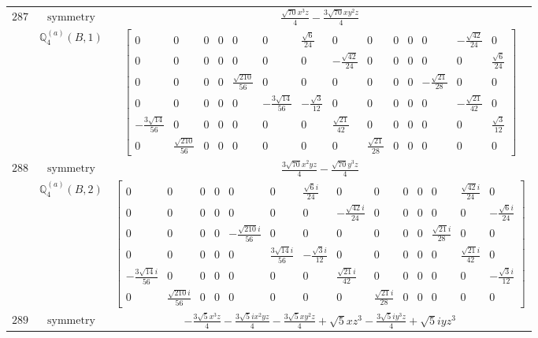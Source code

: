 \documentclass[fleqn,8pt,landscape]{jsarticle}
\begin{document}
\begin{longtable}{ccc}
$ 287 $ & $ \text{symmetry} $ & $ \frac{\sqrt{70} x^{3} z}{4} - \frac{3 \sqrt{70} x y^{2} z}{4} $ \\
$  $ & $ \mathbb{Q}_{4}^{(a)}(B,1) $ & $ \begin{bmatrix} 0 & 0 & 0 & 0 & 0 & 0 & \frac{\sqrt{6}}{24} & 0 & 0 & 0 & 0 & 0 & - \frac{\sqrt{42}}{24} & 0 \\ 0 & 0 & 0 & 0 & 0 & 0 & 0 & - \frac{\sqrt{42}}{24} & 0 & 0 & 0 & 0 & 0 & \frac{\sqrt{6}}{24} \\ 0 & 0 & 0 & 0 & \frac{\sqrt{210}}{56} & 0 & 0 & 0 & 0 & 0 & 0 & - \frac{\sqrt{21}}{28} & 0 & 0 \\ 0 & 0 & 0 & 0 & 0 & - \frac{3 \sqrt{14}}{56} & - \frac{\sqrt{3}}{12} & 0 & 0 & 0 & 0 & 0 & - \frac{\sqrt{21}}{42} & 0 \\ - \frac{3 \sqrt{14}}{56} & 0 & 0 & 0 & 0 & 0 & 0 & \frac{\sqrt{21}}{42} & 0 & 0 & 0 & 0 & 0 & \frac{\sqrt{3}}{12} \\ 0 & \frac{\sqrt{210}}{56} & 0 & 0 & 0 & 0 & 0 & 0 & \frac{\sqrt{21}}{28} & 0 & 0 & 0 & 0 & 0 \end{bmatrix} $ \\ \hline
$ 288 $ & $ \text{symmetry} $ & $ \frac{3 \sqrt{70} x^{2} y z}{4} - \frac{\sqrt{70} y^{3} z}{4} $ \\
$  $ & $ \mathbb{Q}_{4}^{(a)}(B,2) $ & $ \begin{bmatrix} 0 & 0 & 0 & 0 & 0 & 0 & \frac{\sqrt{6} i}{24} & 0 & 0 & 0 & 0 & 0 & \frac{\sqrt{42} i}{24} & 0 \\ 0 & 0 & 0 & 0 & 0 & 0 & 0 & - \frac{\sqrt{42} i}{24} & 0 & 0 & 0 & 0 & 0 & - \frac{\sqrt{6} i}{24} \\ 0 & 0 & 0 & 0 & - \frac{\sqrt{210} i}{56} & 0 & 0 & 0 & 0 & 0 & 0 & \frac{\sqrt{21} i}{28} & 0 & 0 \\ 0 & 0 & 0 & 0 & 0 & \frac{3 \sqrt{14} i}{56} & - \frac{\sqrt{3} i}{12} & 0 & 0 & 0 & 0 & 0 & \frac{\sqrt{21} i}{42} & 0 \\ - \frac{3 \sqrt{14} i}{56} & 0 & 0 & 0 & 0 & 0 & 0 & \frac{\sqrt{21} i}{42} & 0 & 0 & 0 & 0 & 0 & - \frac{\sqrt{3} i}{12} \\ 0 & \frac{\sqrt{210} i}{56} & 0 & 0 & 0 & 0 & 0 & 0 & \frac{\sqrt{21} i}{28} & 0 & 0 & 0 & 0 & 0 \end{bmatrix} $ \\ \hline
$ 289 $ & $ \text{symmetry} $ & $ - \frac{3 \sqrt{5} x^{3} z}{4} - \frac{3 \sqrt{5} i x^{2} y z}{4} - \frac{3 \sqrt{5} x y^{2} z}{4} + \sqrt{5} x z^{3} - \frac{3 \sqrt{5} i y^{3} z}{4} + \sqrt{5} i y z^{3} $ \\

\end{longtable}
\end{document}
